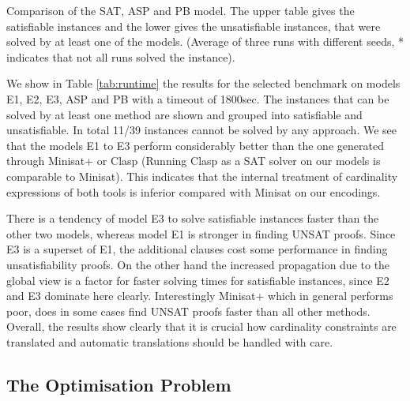 \documentclass[]{easychair}
\begin{document}
\begin{table}[htbp]
    \caption{Comparison of the SAT, ASP and PB model. The upper table gives the satisfiable instances and the lower
    gives the unsatisfiable instances, that were solved by at least one of the models. (Average of three runs with
different seeds, * indicates that not all runs solved the instance).}
    \centering
    
    
    \label{tab:runtime}
\end{table}

We show in Table \ref{tab:runtime} the results for the selected benchmark on models E1, E2, E3, ASP and PB with a timeout
of 1800sec. The instances that can be solved by at least one method are shown and grouped into satisfiable and
unsatisfiable. In total 11/39 instances cannot be solved by any approach. We see that the models E1 to E3 perform
considerably better than the one generated through Minisat+ or Clasp (Running Clasp as a SAT solver on our models is
comparable to Minisat). This indicates that the internal treatment of cardinality expressions of both tools is inferior
compared with Minisat on our encodings. 

There is a tendency of model E3 to solve satisfiable instances faster than the other two models, whereas model E1 is
stronger in finding UNSAT proofs. Since E3 is a superset of E1, the additional clauses cost some performance  in finding
unsatisfiability proofs. On the other hand the increased propagation due to the global view is a factor for faster
solving times for satisfiable instances, since E2 and E3 dominate here clearly. Interestingly Minisat+ which in general
performs poor, does in some cases find UNSAT proofs faster than all other methods. Overall, the results show clearly
that it is crucial how cardinality constraints are translated and automatic translations should be handled with care. 

\subsection{The Optimisation Problem}
\end{document}
